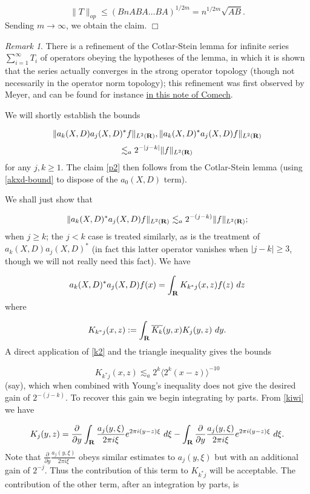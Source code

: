 \documentclass[11pt]{article}
\theoremstyle{definition}
\theoremstyle{remark}
\newtheorem{remark}[theorem]{Remark}
\begin{document}
\[\displaystyle  \|T\|_{op} \leq (B n A B A \dots B A)^{1/2m} = n^{1/2m} \sqrt{AB}.\]
 Sending \({m \rightarrow \infty}\), we obtain the claim. \(\Box\)

\begin{remark}
  There is a refinement of the Cotlar-Stein lemma for infinite series \({\sum_{i=1}^\infty T_i}\) of operators obeying the hypotheses of the lemma, in which it is shown that the series actually converges in the strong operator topology (though not necessarily in the operator norm topology); this refinement was first observed by Meyer, and can be found for instance \href{https://www.math.tamu.edu/~comech/papers/CotlarStein/CotlarStein.pdf}{in this note of Comech}. 

\end{remark}

We will shortly establish the bounds 

\[\displaystyle  \| a_k(X,D) a_j(X,D)^* f\|_{L^2({\bf R})}, \| a_k(X,D)^* a_j(X,D) f\|_{L^2({\bf R})} \]
\[\displaystyle \lesssim_{a} 2^{-|j-k|} \|f\|_{L^2({\bf R})}\]
 for any \({j,k \geq 1}\). The claim \eqref{p2} then follows from the Cotlar-Stein lemma (using \eqref{akxd-bound} to dispose of the \({a_0(X,D)}\) term).


 We shall just show that 

\[\displaystyle  \| a_k(X,D)^* a_j(X,D) f\|_{L^2({\bf R})} \lesssim_{a} 2^{-(j-k)} \|f\|_{L^2({\bf R})};\]
 when \({j \geq k}\); the \({j < k}\) case is treated similarly, as is the treatment of \({a_k(X,D) a_j(X,D)^*}\) (in fact this latter operator vanishes when \({|j-k| \geq 3}\), though we will not really need this fact). We have 

\[\displaystyle a_k(X,D)^* a_j(X,D) f(x) = \int_{\bf R} K_{k^*j}(x,z) f(z)\ dz\]
 where 

\[\displaystyle  K_{k^*j}(x,z) := \int_{\bf R} \overline{K_k}(y,x) K_j(y,z)\ dy.\]
 A direct application of \eqref{k2} and the triangle inequality gives the bounds 

\[\displaystyle K_{k^*j}(x,z) \lesssim_{a} 2^k \langle 2^k(x-z) \rangle^{-10}\]
 (say), which when combined with Young’s inequality does not give the desired gain of \({2^{-(j-k)}}\). To recover this gain we begin integrating by parts. From \eqref{kiwi} we have 

\[\displaystyle  K_j(y,z) =\frac{\partial}{\partial y} \int_{\bf R} \frac{a_j(y,\xi)}{2\pi i \xi} e^{2\pi i (y-z) \xi}\ d\xi - \int_{\bf R} \frac{\partial}{\partial y} \frac{a_j(y,\xi)}{2\pi i \xi} e^{2\pi i (y-z) \xi}\ d\xi.\]
 Note that \({\frac{\partial}{\partial y} \frac{a_j(y,\xi)}{2\pi i \xi}}\) obeys similar estimates to \({a_j(y,\xi)}\) but with an additional gain of \({2^{-j}}\). Thus the contribution of this term to \({K_{k^*j}}\) will be acceptable. The contribution of the other term, after an integration by parts, is 
\end{document}
